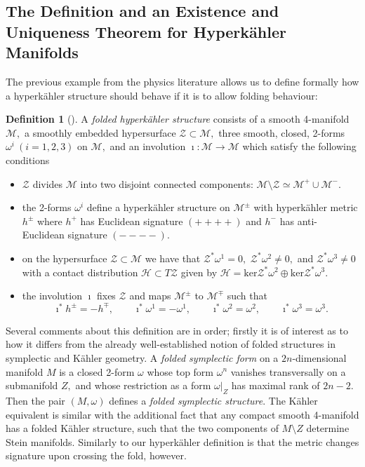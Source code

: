 \documentclass[a4paper,12pt, onecolumn, notitlepage]{article}
\theoremstyle{definition}
\newtheorem{defn}[thm]{Definition}
\theoremstyle{remark}
\newcommand{\w}{\omega}
\newcommand{\K}{K\"ahler }
\newcommand{\HK}{hyperk\"ahler }
\begin{document}
\subsection{The Definition and an Existence and Uniqueness Theorem for Hyperk\"ahler Manifolds}
The previous example from the physics literature allows us to define formally how a \HK structure should behave if it is to allow folding behaviour:\\

\begin{defn}[\cite{hitchin_2015,biquard_2015}]
	\label{hk_def}
	A \emph{folded \HK structure} consists of a smooth 4-manifold $\mathcal{M},$ a smoothly embedded hypersurface $\mathcal{Z}\subset\mathcal{M},$ three smooth, closed, 2-forms $\w^{i}\ (i=1,2,3)$ on $\mathcal{M},$ and an involution $\imath:\mathcal{M}\to\mathcal{M}$ which satisfy the following conditions
	\begin{itemize}
		\item $\mathcal{Z}$ divides $\mathcal{M}$ into two disjoint connected components: $\mathcal{M}\setminus \mathcal{Z}\simeq\mathcal{M}^{+}\cup\mathcal{M}^{-}.$
		\item the 2-forms $\w^{i}$ define a \HK structure on $\mathcal{M}^{\pm}$ with \HK metric $h^{\pm}$ where $h^{+}$ has Euclidean signature $(++++)$ and $h^{-}$ has anti-Euclidean signature $(----).$
		\item on the hypersurface $\mathcal{Z}\subset\mathcal{M}$ we have that $\mathcal{Z}^{\ast}\w^{1}=0,$ $\mathcal{Z}^{\ast}\w^{2}\neq0,$ and $\mathcal{Z}^{\ast}\w^{3}\neq0$ with a contact distribution $\mathcal{H}\subset T\mathcal{Z}$ given by $\mathcal{H}=\text{ker}\mathcal{Z}^{\ast}\w^{2}\oplus\text{ker}\mathcal{Z}^{\ast}\w^{3}.$
		\item the involution $\imath$ fixes $\mathcal{Z}$ and maps $\mathcal{M}^{\pm}$ to $\mathcal{M}^{\mp}$ such that
		\begin{equation}
		\label{def_involution}
		\imath^{\ast}h^{\pm} = -h^{\mp},\qquad \imath^{\ast}\w^{1} = -\w^{1},\qquad \imath^{\ast}\w^{2} = \w^{2},\qquad \imath^{\ast}\w^{3} = \w^{3}.
		\end{equation}
	\end{itemize}
\end{defn}
Several comments about this definition are in order; firstly it is of interest as to how it differs from the already well-established notion of folded structures in symplectic and \K geometry. A \emph{folded symplectic form} on a $2n$-dimensional manifold $M$ is a closed 2-form $\w$ whose top form $\w^{n}$ vanishes transversally on a submanifold $Z,$ and whose restriction as a form $\left.\w\right|_Z$ has maximal rank of $2n-2$. Then the pair $(M,\w)$ defines a \emph{folded symplectic structure}. The \K equivalent is similar with the additional fact that any compact smooth 4-manifold has a folded \K structure, such that the two components of $M\setminus Z$ determine Stein manifolds. Similarly to our \HK definition is that the metric changes signature upon crossing the fold, however.\\
	
\end{document}
